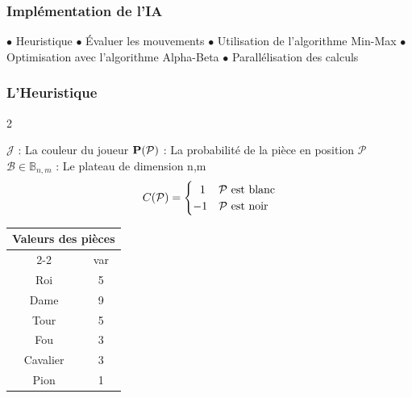 \documentclass[11pt]{beamer}
\begin{document}
	
	\begin{frame}
		\frametitle{Implémentation de l'IA}
		$\bullet$ Heuristique \newline
		$\bullet$ \'{E}valuer les mouvements \newline
		$\bullet$ Utilisation de l'algorithme Min-Max\newline
		$\bullet$ Optimisation avec l'algorithme Alpha-Beta \newline
		$\bullet$ Parallélisation des calculs \newline
	\end{frame}
	
	\begin{frame}
		\frametitle{L'Heuristique}
		\begin{multicols}{2}
			\begin{flushleft}
					$\mathcal{J}$ : La couleur du joueur \medskip \newline
					$\bold{P}(\mathcal{P})$ : La probabilité de la pièce en position $\mathcal{P}$ \medskip \newline
					$\mathcal{B} \in \mathbb{B}_{n,m}$ : Le plateau de dimension n,m \newline
					\begin{equation}
						\notag
						C(\mathcal{P}) =
						\begin{cases}
							\ \; 1 & \mathcal{P} \text{ est blanc}\\
							-1 & \mathcal{P} \text{ est noir}
						\end{cases}       
					\end{equation}
			\end{flushleft}
			
			\begin{flushright}
				\begin{table}[]
					\begin{tabular}{cc}
						\multicolumn{2}{l}{Valeurs des pièces}                    \\ \cline{2-2} 
						\multicolumn{1}{c|}{}          & \multicolumn{1}{c|}{var} \\ \hline
						\multicolumn{1}{|c|}{Roi}      & \multicolumn{1}{c|}{5}   \\ \hline
						\multicolumn{1}{|c|}{Dame}     & \multicolumn{1}{c|}{9}   \\ \hline
						\multicolumn{1}{|c|}{Tour}     & \multicolumn{1}{c|}{5}   \\ \hline
						\multicolumn{1}{|c|}{Fou}      & \multicolumn{1}{c|}{3}   \\ \hline
						\multicolumn{1}{|c|}{Cavalier} & \multicolumn{1}{c|}{3}   \\ \hline
						\multicolumn{1}{|c|}{Pion}     & \multicolumn{1}{c|}{1}   \\ \hline
					\end{tabular}
				\end{table}
			\end{flushright}
		\end{multicols}
		

\end{frame}
\end{document}
